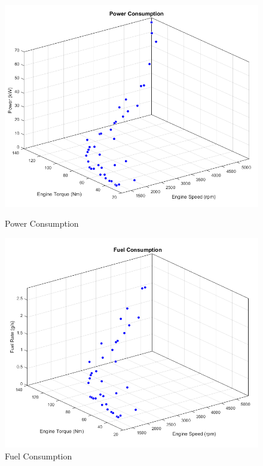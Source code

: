 \begin{figure}[h]
\centering
\begin{minipage}{.5\textwidth}
 	\centering
	\includegraphics[scale=0.35]{figures/power}
	\caption{Power Consumption}
	\label{fig:powerFit}
\end{minipage}%
\begin{minipage}{.5\textwidth}
  	\centering
	\includegraphics[scale=0.35]{figures/fuel}
  	\caption{Fuel Consumption}
  	\label{fig:fuelFit}
\end{minipage}
\end{figure}

